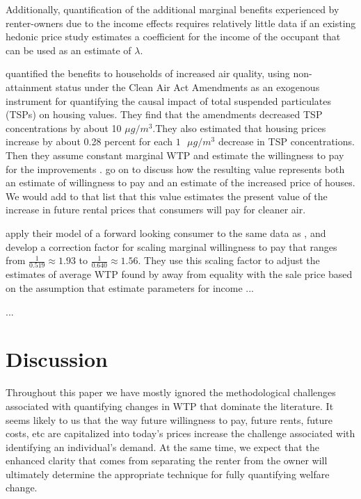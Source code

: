\documentclass[ecta,nameyear,draft]{econsocart}
\theoremstyle{plain}
\theoremstyle{remark}
\begin{document}
Additionally, quantification of the additional marginal benefits experienced by renter-owners due to the income effects requires relatively little data if an existing hedonic price study estimates a coefficient for the income of the occupant that can be used as an estimate of $\lambda$.

\cite{chaygreenstone05} quantified the benefits to households of increased air quality, using non-attainment status under the Clean Air Act Amendments as an exogenous instrument for quantifying the causal impact of total suspended particulates (TSPs) on housing values. They find that the amendments decreased TSP concentrations by about 10 $\mu g/m^3$.They also estimated that housing prices increase by about 0.28 percent for each $1 \text{ }{\mu g/m^3}$ decrease in TSP concentrations. Then they assume constant marginal WTP and estimate the willingness to pay for the improvements . \cite{chaygreenstone05} go on to discuss how the resulting value represents both an estimate of willingness to pay and an estimate of the increased price of houses. We would add to that list that this value estimates the present value of the increase in future rental prices that consumers will pay for cleaner air.

\cite{bishop19} apply their model of a forward looking consumer to the same data as \cite{chaygreenstone05}, and develop a correction factor for scaling marginal willingness to pay that ranges from $\frac{1}{0.519} \approx 1.93$ to $\frac{1}{0.640} \approx 1.56$. They use this scaling factor to adjust the estimates of average WTP found by \cite{chaygreenstone05} away from equality with the sale price based on the assumption that  
\cite{smithhuang95} estimate parameters for income 
...

...






\section{Discussion}
Throughout this paper we have mostly ignored the methodological challenges associated with quantifying changes in WTP that dominate the literature. It seems likely to us that the way future willingness to pay, future rents, future costs, etc are capitalized into today's prices increase the challenge associated with identifying an individual's demand. At the same time, we expect that the enhanced clarity that comes from separating the renter from the owner will ultimately determine the appropriate technique for fully quantifying welfare change.
\end{document}
